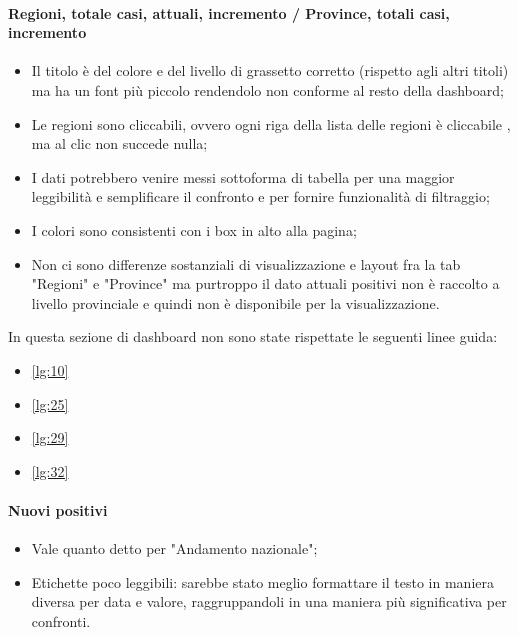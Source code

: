\paragraph{Regioni, totale casi, attuali, incremento / Province, totali casi, incremento}
\begin{itemize}
    \item Il titolo è del colore e del livello di grassetto corretto (rispetto agli altri titoli) ma ha un font più piccolo rendendolo non conforme al resto della dashboard;
    \item Le regioni sono cliccabili, ovvero ogni riga della lista delle regioni è cliccabile , ma al clic non succede nulla;
    \item I dati potrebbero venire messi sottoforma di tabella  per una maggior leggibilità e semplificare il confronto e per fornire funzionalità di filtraggio;
    \item I colori sono consistenti con i box in alto alla pagina;
    \item Non ci sono differenze sostanziali di visualizzazione e layout fra la tab "Regioni" e "Province" ma purtroppo il dato attuali positivi non è raccolto a livello provinciale e quindi non è disponibile per la visualizzazione.
\end{itemize}
In questa sezione di dashboard non sono state rispettate le seguenti linee guida:
\begin{itemize}
    \item \ref{lg:10}
    \item \ref{lg:25}
    \item \ref{lg:29}
    \item \ref{lg:32}
\end{itemize}
\paragraph{Nuovi positivi}
\begin{itemize}
        \item Vale quanto detto per "Andamento nazionale";
        \item Etichette poco leggibili: sarebbe stato meglio formattare il testo in maniera diversa per data e valore, raggruppandoli in una maniera più significativa per confronti.
\end{itemize}


